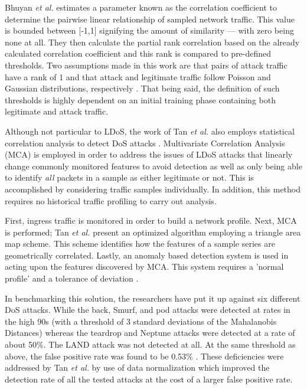 \documentclass[conference]{IEEEtran}
\begin{document}
Bhuyan \textit{et al.} estimates a parameter known as the correlation coefficient to determine the pairwise linear relationship of sampled network traffic. This value is bounded between [-1,1] signifying the amount of similarity --- with zero being none at all. They then calculate the partial rank correlation based on the already calculated correlation coefficient and this rank is compared to pre-defined thresholds. Two assumptions made in this work are that pairs of attack traffic have a rank of 1 and that attack and legitimate traffic follow Poisson and Gaussian distributions, respectively \cite{Bhuyan:partialRank}. That being said, the definition of such thresholds is highly dependent on an initial training phase containing both legitimate and attack traffic.

Although not particular to LDoS, the work of Tan \textit{et al.} also employs statistical correlation analysis to detect DoS attacks \cite{Tan:MCA}. Multivariate Correlation Analysis (MCA) is employed in order to address the issues of LDoS attacks that linearly change commonly monitored features to avoid detection as well as only being able to identify \textit{all} packets in a sample as either legitimate or not. This is accomplished by considering traffic samples individually. In addition, this method requires no historical traffic profiling to carry out analysis.

First, ingress traffic is monitored in order to build a network profile. Next, MCA is performed; Tan \textit{et al.} present an optimized algorithm employing a triangle area map scheme. This scheme identifies how the features of a sample series are geometrically correlated. Lastly, an anomaly based detection system is used in acting upon the features discovered by MCA. This system requires a 'normal profile' and a tolerance of deviation \cite{Tan:MCA}.

In benchmarking this solution, the researchers have put it up against six different DoS attacks. While the back, Smurf, and pod attacks were detected at rates in the high 90s (with a threshold of 3 standard deviations of the Mahalanobis Distances) whereas the teardrop and Neptune attacks were detected at a rate of about 50\%. The LAND attack was not detected at all. At the same threshold as above, the false positive rate was found to be 0.53\% \cite{Tan:MCA}. These deficiencies were addressed by Tan \textit{et al.} by use of data normalization which improved the detection rate of all the tested attacks at the cost of a larger false positive rate.  
\end{document}
